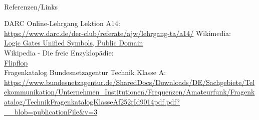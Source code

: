\renewcommand{\refname}{Referenzen}

\hypertarget{refs}{}
\textcolor{white}{} \\ %
\Large Referenzen/Links
\footnotesize

\begin{thebibliography}{}
    DARC Online-Lehrgang Lektion A14:\\
    \url{https://www.darc.de/der-club/referate/ajw/lehrgang-ta/a14/}
    Wikimedia:\\
    \href{https://commons.wikimedia.org/wiki/Logic_gates_unified_symbols}{Logic Gates Unified Symbols, Public Domain}\\
      Wikipedia - Die freie Enzyklopädie:\\
    \href{https://de.wikipedia.org/wiki/Flipflop}{Flipflop}\\
     Fragenkatalog Bundesnetzagentur Technik Klasse A:\\
    \url{https://www.bundesnetzagentur.de/SharedDocs/Downloads/DE/Sachgebiete/Telekommunikation/Unternehmen_Institutionen/Frequenzen/Amateurfunk/Fragenkatalog/TechnikFragenkatalogKlasseAf252rId9014pdf.pdf?__blob=publicationFile&v=3}
\end{thebibliography}


